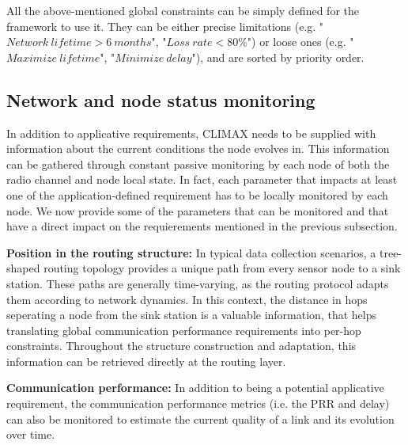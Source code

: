 \documentclass[12pt,journal,compsoc]{IEEEtran}
\begin{document}
All the above-mentioned global constraints can be simply defined for the framework to use it. They can be either precise limitations (e.g. "$Network ~lifetime > 6 ~months$",  "$Loss ~rate < 80\%$") or loose ones (e.g. "$Maximize ~lifetime$",  "$Minimize ~delay$"), and are sorted by priority order.





\subsection{Network and node status monitoring}

In addition to applicative requirements, CLIMAX needs to be supplied with information about the current conditions the node evolves in. This information can be gathered through constant passive monitoring by each node of both the radio channel and node local state. 
In fact, each parameter that impacts at least one of the application-defined requirement has to be locally monitored by each node. We now provide some of the parameters that can be monitored and that have a direct impact on the requierements mentioned in the previous subsection.

\textbf{Position in the routing structure:} In typical data collection scenarios, a tree-shaped routing topology provides a unique path from every sensor node to a sink station. These paths are generally time-varying, as the routing protocol adapts them according to network dynamics. In this context, the distance in hops seperating a node from the sink station is a valuable information, that helps translating global communication performance requirements into per-hop constraints. Throughout the structure construction and adaptation, this information can be retrieved directly at the routing layer.

\textbf{Communication performance:} In addition to being a potential applicative requirement, the communication performance metrics (i.e. the PRR and delay) can also be monitored to estimate the current quality of a link and its evolution over time. %
\end{document}
